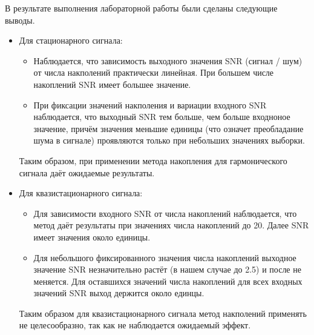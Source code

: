 \documentclass[12pt, a4paper] {ncc}
\begin{document}
В результате выполнения лабораторной работы были сделаны следующие выводы.
\begin{itemize}
	\item Для стационарного сигнала:
		 \begin{itemize}
		  	\item Наблюдается, что зависимость выходного значения SNR (сигнал / шум) от
        		  числа накполений практически линейная. При большем числе накоплений
        		  SNR имеет большее значение.
			\item При фиксации значений накполения и вариации входного SNR наблюдается, что выходный SNR
				  тем больше, чем больше входноное значение, причём значения меньшие единицы (что означет
				  преобладание шума в сигнале) проявляются только при небольших значениях выборки.
		\end{itemize}
		Таким образом, при применении метода накопления для гармонического сигнала даёт ожидаемые
		результаты. 
	\item  Для квазистационарного сигнала:
		\begin{itemize}
			\item Для зависимости входного SNR от числа накоплений наблюдается, что
				  метод даёт результаты при значениях числа накоплений до 20. Далее
				 SNR имеет значения около единицы. 		
			\item Для небольшого фиксированного значения числа накоплений
				  выходное значение SNR незначительно растёт (в нашем случае до 2.5)
				  и после не меняется. Для оставшихся значений числа накоплений для 
				  всех входных значений SNR выход держится около единцы.
		\end{itemize}
    Таким образом для квазистационарного сигнала метод накполений применять не целесообразно,
	так как не наблюдается ожидаемый эффект.
\end{itemize}
\end{document}
